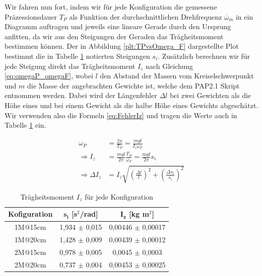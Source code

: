 \documentclass{article}
\begin{document}
Wir fahren nun fort, indem wir für jede Konfiguration die gemessene Präzessionsdauer $T_P$ als Funktion der durchschnittlichen Drehfrequenz $\overline{\omega}_m$ in ein Diagramm auftragen und jeweils eine lineare Gerade durch den Ursprung anfitten, da wir aus den Steigungen der Geraden das Trägheitsmoment bestimmen können. Der in Abbildung \ref{plt:TPvsOmega_F} dargestellte Plot bestimmt die in Tabelle \ref{tab:I_z} notierten Steigungen $s_i$. Zusätzlich berechnen wir für jede Steigung direkt das Trägheitsmoment $I_z$ nach Gleichung \ref{eq:omegaP_omegaF}, wobei $l$ den Abstand der Massen vom Kreiselschwerpunkt und $m$ die Masse der angebrachten Gewichte ist, welche dem PAP2.1 Skript entnommen werden. Dabei wird der Längenfehler $\Delta l$ bei zwei Gewichten als die Höhe eines und bei einem Gewicht als die halbe Höhe eines Gewichts abgeschätzt. Wir verwenden also die Formeln \ref{eq:FehlerIz} und tragen die Werte auch in Tabelle \ref{tab:I_z} ein.

\begin{equation}
    \begin{split}
        \omega_P &= \frac{2 \pi}{T_P} = \frac{mgl}{I_z \omega_F} \\
        \Rightarrow I_z &= \frac{mgl}{2 \pi} \frac{T_P}{\omega_F} = \frac{mgl}{2 \pi} s_i \\
        \Rightarrow \Delta I_z &= I_z \sqrt{\left( \frac{\Delta l}{l} \right)^2 + \left( \frac{\Delta s_i}{s_i} \right)^2}
    \end{split}
    \label{eq:FehlerIz}
\end{equation}

\begin{table}[!h]
    \centering
    \begin{tabular}{ccc}
        \hline
        \textbf{Kofiguration} & $\bm{s_i}$ [s$^2$/rad] & $\bm{I_z}$ [kg m$^2$] \\ \hline
         1M@15cm  & 1,934 $\pm$ 0,015 & 0,00446 $\pm$ 0,00017 \\
         1M@20cm  & 1,428 $\pm$ 0,009 & 0,00439 $\pm$ 0,00012 \\
         2M@15cm  & 0,978 $\pm$ 0,005 & 0,0045 $\pm$ 0,0003 \\
         2M@20cm  & 0,737 $\pm$ 0,004 & 0,00453 $\pm$ 0,00025 \\ \hline
    \end{tabular}%
    \caption{Trägheitsmoment $I_z$ für jede Konfiguration}
    \label{tab:I_z}
\end{table}
\end{document}
